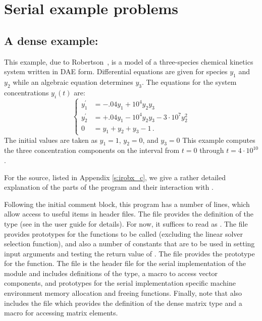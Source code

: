\section{Serial example problems}\label{s:ex_serial}

\subsection{A dense example: }\label{ss:irobx}

This example, due to Robertson~\cite{Rob:66}, is a model of a three-species 
chemical kinetics system written in DAE form. Differential equations are given 
for species $y_1$ and $y_2$ while an algebraic equation determines $y_3$. The 
equations for the system concentrations $y_i(t)$ are:
\begin{equation}\label{e:irobx_ODE}
\begin{cases}
  y^\prime_1 &= -.04 y_1 + 10^4 y_2 y_3   \\
  y^\prime_2 &= +.04 y_1 - 10^4 y_2 y_3 - 3 \cdot 10^7 y_2^2  \\
  0 &=  y_1 + y_2 + y_3 - 1 \, .
\end{cases}
\end{equation}
The initial values are taken as $y_1 = 1$, $y_2 = 0$, and $y_3 = 0$
This example computes the three concentration components on the interval
from $t=0$ through $t=4 \cdot 10^{10}$.

For the source, listed in Appendix \ref{s:irobx_c}, we give a rather detailed
explanation of the parts of the program and their interaction with {\ida}.

Following the initial comment block, this program has a number
of  lines, which allow access to useful items in {\ida}
header files.  The  file provides the definition of the
type  (see  in the user guide \cite{ida2.2.0_ug}
for details).  For now, it suffices to read  as .
The  file provides prototypes for the {\ida}
functions to be called (excluding the linear solver selection
function), and also a number of constants that are to be used in
setting input arguments and testing the return value of .
The  file provides the prototype for the  function.
The  file is the header file for the serial
implementation of the {\nvector} module and includes definitions of the 
 type, a macro to access vector components, and prototypes 
for the serial implementation specific machine environment memory allocation
and freeing functions.
Finally, note that  also includes the  file which 
provides the definition of the dense matrix type  and a macro for 
accessing matrix elements.

